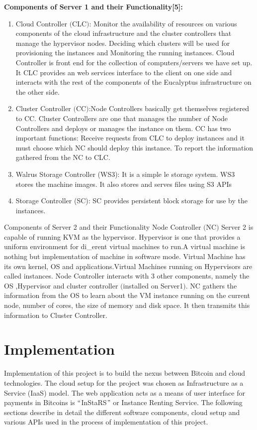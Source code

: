 \documentclass[a4page,12pt]{article}
\begin{document}
\textbf{Components of Server 1 and their Functionality[5]:}
\begin{enumerate}
\item Cloud Controller $($CLC$)$: Monitor the availability of resources on various components of the cloud infrastructure and the cluster controllers that manage the hypervisor nodes. Deciding which clusters will be used for provisioning the instances and Monitoring the running instances. Cloud Controller is front end for the collection of computers/servers we have set up. It CLC provides an web services interface to the client on one side and interacts with the rest of the components of the Eucalyptus infrastructure on the other side.
\item Cluster Controller $($CC$)$:Node Controllers basically get themselves registered to CC. Cluster Controllers are one that manages the number of Node Controllers and deploys or manages the instance on them. CC has two important functions:
Receive requests from CLC to deploy instances and it must choose which NC should deploy this instance.
To report the information gathered from the NC to CLC.
\item Walrus Storage Controller (WS3): It is a simple le storage system. WS3 stores  the machine images. It also stores and serves files using S3 APIs
\item Storage Controller (SC): SC provides persistent block storage for use by the instances.
\end{enumerate}
Components of Server 2 and their Functionality
Node Controller $($NC$)$  Server 2 is capable of running KVM as the hypervisor. Hypervisor is one that provides a uniform environment for di\_erent virtual 
machines to run.A virtual machine is nothing but implementation of machine in software mode. Virtual Machine has its own kernel, OS and applications.Virtual Machines running on Hypervisors are called instances. Node Controller interacts with 3 other components, namely the OS ,Hypervisor and cluster controller $($installed on Server1$)$. NC gathers the information from the OS to learn about the VM instance running on the current node, number of cores, the size of memory and disk space. It then transmits this information to Cluster Controller.
\pagebreak
\section{Implementation}
Implementation of this project is to build the nexus between Bitcoin and cloud technologies. The cloud setup for the project was chosen as Infrastructure as a Service (IaaS) model. The web application acts as a means of user interface for payments in Bitcoins is $``$InStaRS$"$ or Instance Renting Service.  
The following sections describe in detail the different software components, cloud setup and various APIs used in the process of implementation of this project.
\end{document}
